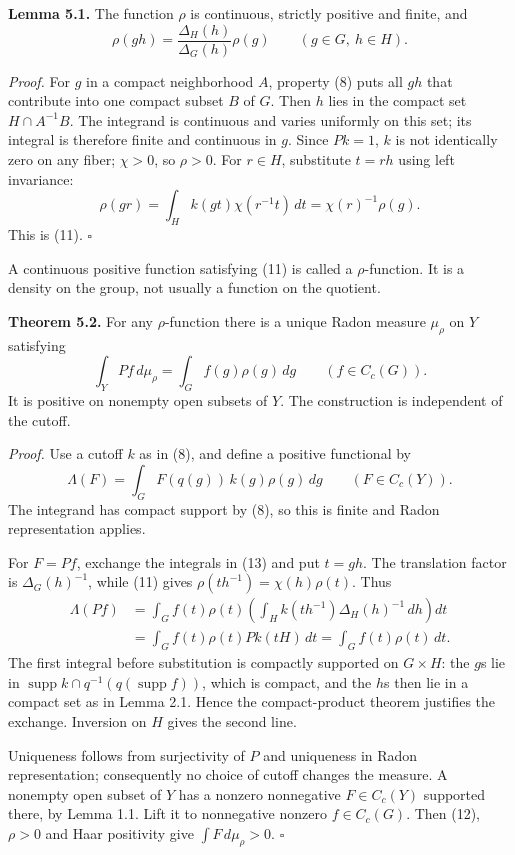 \documentclass[
  english,
  11pt,
  a4paper,
]{article}
\newcounter{none} %
\begin{document}
\textbf{Lemma 5.1.} The function \(\rho\) is continuous, strictly
positive and finite, and
\[\rho(gh)=\frac{\Delta_H(h)}{\Delta_G(h)}\rho(g)
\qquad(g\in G,\ h\in H).
\tag{11}\]

\emph{Proof.} For \(g\) in a compact neighborhood \(A\), property (8)
puts all \(gh\) that contribute into one compact subset \(B\) of \(G\).
Then \(h\) lies in the compact set \(H\cap A^{-1}B\). The integrand is
continuous and varies uniformly on this set; its integral is therefore
finite and continuous in \(g\). Since \(Pk=1\), \(k\) is not identically
zero on any fiber; \(\chi>0\), so \(\rho>0\). For \(r\in H\), substitute
\(t=rh\) using left invariance: \[\rho(gr)=\int_H k(gt)\chi(r^{-1}t)\,dt
=\chi(r)^{-1}\rho(g).\] This is (11). \(\square\)

A continuous positive function satisfying (11) is called a
\(\rho\)-function. It is a density on the group, not usually a function
on the quotient.

\textbf{Theorem 5.2.} For any \(\rho\)-function there is a unique Radon
measure \(\mu_\rho\) on \(Y\) satisfying
\[\int_Y Pf\,d\mu_\rho=\int_G f(g)\rho(g)\,dg
\qquad(f\in C_c(G)).
\tag{12}\] It is positive on nonempty open subsets of \(Y\). The
construction is independent of the cutoff.

\emph{Proof.} Use a cutoff \(k\) as in (8), and define a positive
functional by \[\Lambda(F)=\int_G F(q(g))\,k(g)\rho(g)\,dg
\qquad(F\in C_c(Y)).
\tag{13}\] The integrand has compact support by (8), so this is finite
and Radon representation applies.

For \(F=Pf\), exchange the integrals in (13) and put \(t=gh\). The
translation factor is \(\Delta_G(h)^{-1}\), while (11) gives
\(\rho(th^{-1})=\chi(h)\rho(t)\). Thus \[\begin{aligned}
\Lambda(Pf)
&=\int_G f(t)\rho(t)
\left(\int_H k(th^{-1})\Delta_H(h)^{-1}\,dh\right)dt\\
&=\int_G f(t)\rho(t)Pk(tH)\,dt
=\int_G f(t)\rho(t)\,dt.
\end{aligned}
\tag{14}\] The first integral before substitution is compactly supported
on \(G\times H\): the \(g\)\textquotesingle s lie in
\(\operatorname{supp}k\cap q^{-1}(q(\operatorname{supp}f))\), which is
compact, and the \(h\)\textquotesingle s then lie in a compact set as in
Lemma 2.1. Hence the compact-product theorem justifies the exchange.
Inversion on \(H\) gives the second line.

Uniqueness follows from surjectivity of \(P\) and uniqueness in Radon
representation; consequently no choice of cutoff changes the measure. A
nonempty open subset of \(Y\) has a nonzero nonnegative \(F\in C_c(Y)\)
supported there, by Lemma 1.1. Lift it to nonnegative nonzero
\(f\in C_c(G)\). Then (12), \(\rho>0\) and Haar positivity give
\(\int F\,d\mu_\rho>0\). \(\square\)
\end{document}
